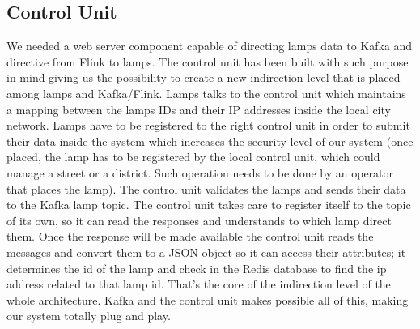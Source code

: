 \subsection{Control Unit}
We needed a web server component capable of directing lamps data to Kafka and directive from Flink to lamps. The control unit has been built with such purpose in mind giving us the possibility to create a new indirection level that is placed among lamps and Kafka/Flink. Lamps talks to the control unit which maintains a mapping between the lamps IDs and their IP addresses inside the local city network. Lamps have to be registered to the right control unit in order to submit their data inside the system which increases the security level of our system (once placed, the lamp has to be registered by the local control unit, which could manage a street or a district. Such operation needs to be done by an operator that places the lamp). The control unit validates the lamps and sends their data to the Kafka lamp topic. The control unit takes care to register itself to the topic of its own, so it can read the responses and understands to which lamp direct them. Once the response will be made available the control unit reads the messages and convert them to a JSON object so it can access their attributes; it determines the id of the lamp and check in the Redis database to find the ip address related to that lamp id. That’s the core of the indirection level of the whole architecture. Kafka and the control unit makes possible all of this, making our system totally plug and play. 

